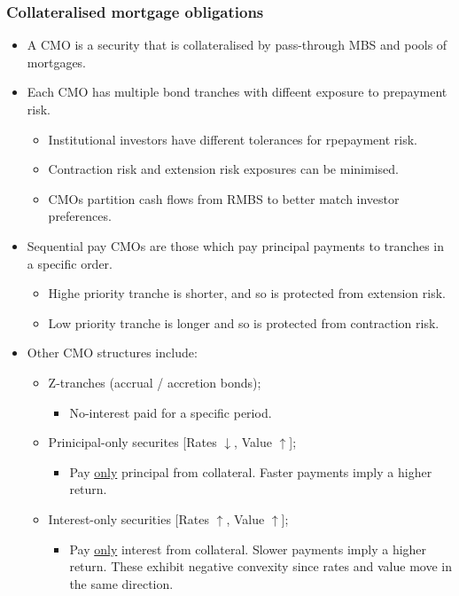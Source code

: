\documentclass[../notes_compiled.tex]{subfiles}
\begin{document}
\subsubsection{Collateralised mortgage obligations}
\begin{itemize}
\item A CMO is a security that is collateralised by pass-through MBS and pools of mortgages.
\item Each CMO has multiple bond tranches with diffeent exposure to prepayment risk.
\begin{itemize}
\item Institutional investors have different tolerances for rpepayment risk.
\item Contraction risk and extension risk exposures can be minimised.
\item CMOs partition cash flows from RMBS to better match investor preferences.
\end{itemize}
\item Sequential pay CMOs are those which pay principal payments to tranches in a specific order.
\begin{itemize}
\item Highe priority tranche is shorter, and so is protected from extension risk.
\item Low priority tranche is longer and so is protected from contraction risk.
\end{itemize}
\item Other CMO structures include:
\begin{itemize}
\item Z-tranches (accrual / accretion bonds);
\begin{itemize}
\item No-interest paid for a specific period.
\end{itemize}
\item Prinicipal-only securites [Rates $\downarrow$, Value $\uparrow$];
\begin{itemize}
\item Pay \underline{only} principal from collateral. Faster payments imply a higher return.
\end{itemize}
\item Interest-only securities [Rates $\uparrow$, Value $\uparrow$];
\begin{itemize}
\item Pay \underline{only} interest from collateral. Slower payments imply a higher return. These exhibit negative convexity since rates and value move in the same direction.

\end{itemize}
\end{itemize}
\end{itemize}
\end{document}
